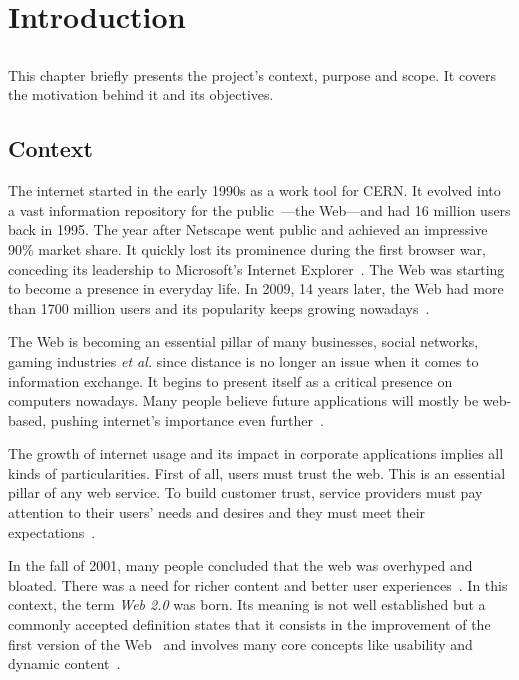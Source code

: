 \chapter{Introduction} %
\label{cha:introduction}

\section*{} %
This chapter briefly presents the project's context, purpose and scope. It covers the motivation behind it and its objectives.%


\section{Context} %
\label{sec:context}
The internet started in the early 1990s as a work tool for CERN. It evolved into a vast information repository for the public~\cite{teaching_webdev_web20}---the Web---and had 16 million users back in 1995. The year after Netscape went public and achieved an impressive 90\% market share. It quickly lost its prominence during the first browser war, conceding its leadership to Microsoft's Internet Explorer~\cite{browser_wars}. The Web was starting to become a presence in everyday life. In 2009, 14 years later, the Web had more than 1700 million users and its popularity keeps growing nowadays~\cite{internet_stats}.

The Web is becoming an essential pillar of many businesses, social networks, gaming industries \textit{et al.} since distance is no longer an issue when it comes to information exchange.  It begins to present itself as a critical presence on computers nowadays. Many people believe future applications will mostly be web-based, pushing internet's importance even further~\cite{browser_application_platform}.

The growth of internet usage and its impact in corporate applications implies all kinds of particularities. First of all, users must trust the web. This is an essential pillar of any web service. To build customer trust, service providers must pay attention to their users' needs and desires and they must meet their expectations~\cite{trust_semantic_web}. 

In the fall of 2001, many people concluded that the web was overhyped and bloated. There was a need for richer content and better user experiences~\cite{oreilly_web20}. In this context, the term \textit{Web 2.0} was born. Its meaning is not well established but a commonly accepted definition states that it consists in the improvement of the first version of the Web~\cite{rubyonrails_tutorial} and involves many core concepts like usability and dynamic content~\cite{what_is_web20}.

